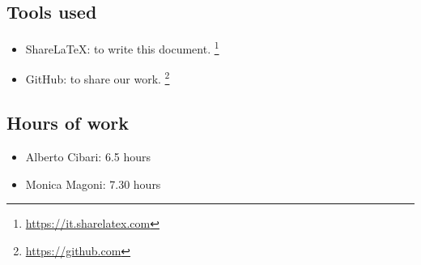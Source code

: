 \subsection*{Tools used}
    \begin{itemize}
        \item ShareLaTeX: to write this document. \footnote{\url{https://it.sharelatex.com}}
        \item GitHub: to share our work. \footnote{\url{https://github.com}} 
    \end{itemize}
\subsection*{Hours of work}
    \begin{itemize}
        \item Alberto Cibari: 6.5 hours
        \item Monica Magoni: 7.30 hours
    \end{itemize}
